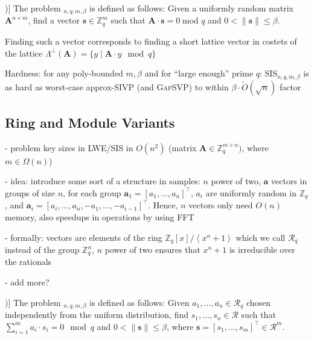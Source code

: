 \documentclass[
  a4paper,  %
  twoside,  %
  bibliography=totoc,
  headsepline,
  cleardoublepage=empty,
  parskip=half,
  draft=false
]{scrbook}
\begin{document}
\begin{definition}[SIS Problem (Adapted from [\citealp{LS15}, Definition 3.1])]
  The problem $_{n, q, m, \beta}$ is defined as follows: Given a uniformly random matrix $\mathbf{A}^{n\times m}$, find a vector $\mathbf{s} \in \mathbb{Z}_q^m$ such that $\mathbf{A} \cdot \mathbf{s} = 0 \; \text{mod } q$ and $0 < \| \mathbf{s}\| \leq \beta$.
\end{definition}

Finding such a vector corresponds to finding a short lattice vector in costets of the lattice $\Lambda^{\perp}(\mathbf{A}) = \{ y \mid \mathbf{A} \cdot y \mod q \}$ %

Hardness: for any poly-bounded $m, \beta$ and for ``large enough'' prime $q$: SIS$_{n, q, m, \beta}$ is as hard as worst-case approx-SIVP (and \textsc{GapSVP}) to within $\beta \cdot \tilde{O}(\sqrt{n})$ factor 



\subsection{Ring and Module Variants} 
- problem key sizes in LWE/SIS in $O(n^2)$ (matrix $\mathbf{A} \in \mathbb{Z}_q^{m \times n})$, where $m \in \Omega(n)$)%

- idea: introduce some sort of a structure in samples: $n$ power of two, $\mathbf{a}$ vectors in groups of size $n$, for each group $\mathbf{a}_1 = [a_1, \ldots, a_n]^\intercal$, $a_i$ are uniformly random in $\mathbb{Z}_q$, and $\mathbf{a}_i = [a_i, \ldots, a_n, -a_1, \ldots, -a_{i-1}]^\intercal$. Hence, $n$ vectors only need $O(n)$ memory, also speedups in operations by using FFT %

- formally: vectors are elements of the ring $\mathbb{Z}_q\left[x\right] / \left\langle x^n + 1 \right\rangle$ which we call $\mathcal{R}_q$ instead of the group $\mathbb{Z}_q^n$, $n$ power of two ensures that $x^n + 1$ is irreducible over the rationals%

- add more? %

\begin{definition}[Ring-SIS Problem [\citealp{LS15}, Definition 3.3])]
  The problem $_{n, q, m, \beta}$ is defined as follows: Given $a_1, \ldots, a_n \in \mathcal{R}_q$ chosen independently from the uniform distribution, find $s_1, \ldots, s_n \in \mathcal{R}$ such that $\sum_{i=1}^m a_i \cdot s_i = 0 \mod q$ and $0 < \| \mathbf{s}\| \leq \beta$, where $\mathbf{s} = \left[s_1, \ldots, s_m\right]^\intercal \in \mathcal{R}^m$.
\end{definition} %
\end{document}
